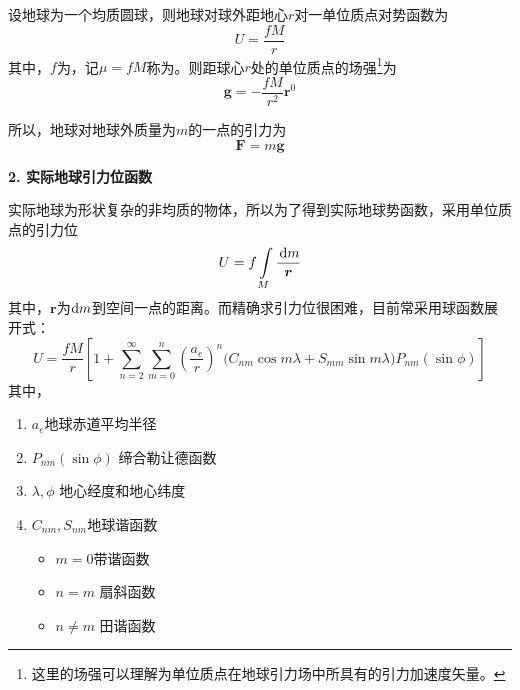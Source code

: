 
设地球为一个均质圆球，则地球对球外距地心$r$对一单位质点对势函数为
\begin{equation}
	U = \dfrac{f M}{r}
\end{equation}
其中，$f$为，记$\mu = f M$称为。则距球心$r$处的单位质点的场强\footnote[1]{这里的场强可以理解为单位质点在地球引力场中所具有的引力加速度矢量。}为
\begin{equation}
	\bm{g} = - \dfrac{fM}{r^2} \bm{r}^0
\end{equation}

所以，地球对地球外质量为$m$的一点的引力为
\begin{equation}
	\bm{F} = m \bm{g}
\end{equation}

\noindent \textbf{2. 实际地球引力位函数}

实际地球为形状复杂的非均质的物体，所以为了得到实际地球势函数，采用单位质点的引力位
\begin{equation}
	U = f \int\limits_{M} \dfrac{\, {\rm{d}} m}{\bm{r}}
\end{equation}
其中，$\bm{r}$为${\rm{d}} m$到空间一点的距离。而精确求引力位很困难，目前常采用球函数展开式：
\begin{equation}
	U = \dfrac{fM}{r}\left[1 + \sum_{n=2}^\infty \sum_{m=0}^{n} \left(\dfrac{a_e}{r}\right)^n \big(C_{nm}\cos m \lambda +  S_{mm} \sin m \lambda \big)P_{nm}(\sin \phi)\right]
\end{equation}
其中，
\begin{enumerate}[\hspace*{2em}]
	\item $a_e$\quad 地球赤道平均半径\hspace*{-0.5em}
	\item $P_{nm}(\sin \phi)$ \quad 缔合勒让德函数\hspace*{-0.5em}
	\item $\lambda, \phi$ \quad 地心经度和地心纬度\hspace*{-0.5em}
	\item $C_{nm}, S_{nm}$\quad 地球谐函数\hspace*{-0.5em}
	\begin{itemize}
		\item $m = 0$\quad  带谐函数\hspace*{-0.5em}
		\item $n=m$ \quad 扇斜函数\hspace*{-0.5em}
		\item $n \neq m$ \quad 田谐函数
	\end{itemize}
\end{enumerate}

